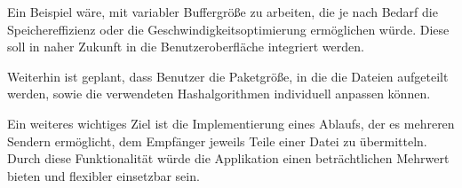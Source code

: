 Ein Beispiel wäre, mit variabler Buffergröße zu arbeiten, die je nach Bedarf die Speichereffizienz oder die Geschwindigkeitsoptimierung ermöglichen würde. Diese soll in naher Zukunft in die Benutzeroberfläche integriert werden.

Weiterhin ist geplant, dass Benutzer die Paketgröße, in die die Dateien aufgeteilt werden, sowie die verwendeten Hashalgorithmen individuell anpassen können.

Ein weiteres wichtiges Ziel ist die Implementierung eines Ablaufs, der es mehreren Sendern ermöglicht, dem Empfänger jeweils Teile einer Datei zu übermitteln. Durch diese Funktionalität würde die Applikation einen beträchtlichen Mehrwert bieten und flexibler einsetzbar sein.
